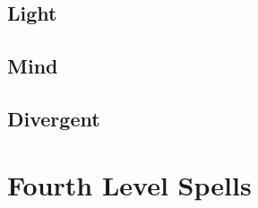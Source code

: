 \begin{multicols}{2}
\subsection{Light}


\subsection{Mind}



\subsection{Divergent}


\end{multicols}

\section{Fourth Level Spells}


